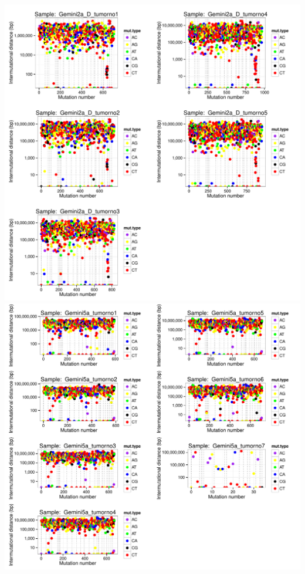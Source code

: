 \documentclass[a4paper,11pt]{article}
\begin{document}
\includegraphics{CLLpilot_rainfallplots_pub-002}
\\
\includegraphics{CLLpilot_rainfallplots_pub-003}
\\
\end{document}
